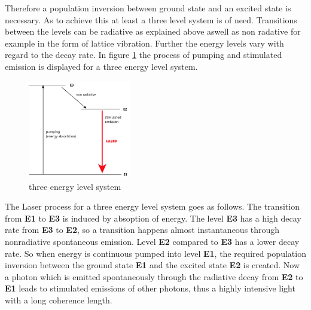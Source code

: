Therefore a population inversion
between ground state and an excited
state is necessary. As to achieve this at least
a three level system is of need.
Transitions between the levels can be radiative as explained above
aswell as non radative for example in the form of lattice vibration.
Further the energy levels vary with regard
to the decay rate. In figure \ref{fig:3_n} the process of pumping and stimulated emission
is displayed for a three energy level system.
\begin{figure}
  \centering
  \includegraphics[width=0.4\textwidth]{Laser_3_Niveau.jpg}
  \caption{three energy level system}
  \label{fig:3_n}
\end{figure}
The Laser process for a three energy level system
goes as follows.
The transition from \textbf{E1} to \textbf{E3} is induced
by absoption of energy.
The level \textbf{E3} has a high
decay rate from \textbf{E3} to \textbf{E2},
so a transition happens almost instantaneous
through nonradiative spontaneous emission.
Level \textbf{E2} compared to \textbf{E3}
has a lower decay rate.
So when energy is continuous
pumped into level \textbf{E1},
the required population inversion
between the ground state \textbf{E1} and the
excited state \textbf{E2} is created.
Now a photon which is emitted spontaneously
through the radiative decay from
\textbf{E2} to \textbf{E1}
leads to
stimulated emissions of other photons,
thus a highly intensive
light with a long coherence length.

